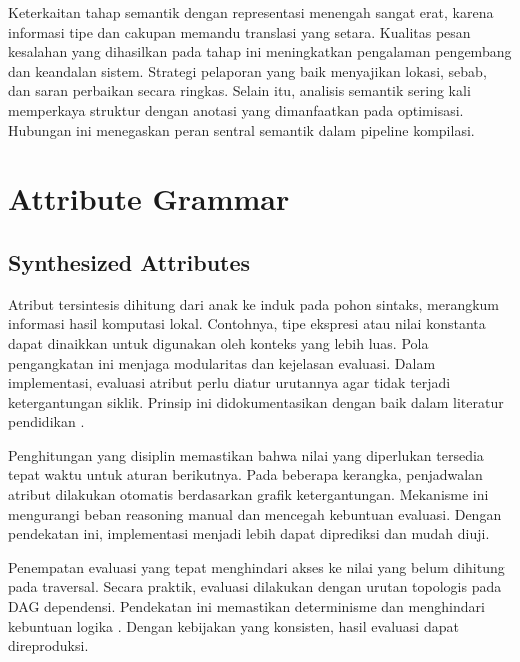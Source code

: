 \documentclass[../main.tex]{subfiles}
\begin{document}
Keterkaitan tahap semantik dengan representasi menengah sangat erat, karena informasi tipe dan cakupan memandu translasi yang setara. Kualitas pesan kesalahan yang dihasilkan pada tahap ini meningkatkan pengalaman pengembang dan keandalan sistem. Strategi pelaporan yang baik menyajikan lokasi, sebab, dan saran perbaikan secara ringkas. Selain itu, analisis semantik sering kali memperkaya struktur dengan anotasi yang dimanfaatkan pada optimisasi. Hubungan ini menegaskan peran sentral semantik dalam pipeline kompilasi.

\section{Attribute Grammar}
\subsection{Synthesized Attributes}
Atribut tersintesis dihitung dari anak ke induk pada pohon sintaks, merangkum informasi hasil komputasi lokal. Contohnya, tipe ekspresi atau nilai konstanta dapat dinaikkan untuk digunakan oleh konteks yang lebih luas. Pola pengangkatan ini menjaga modularitas dan kejelasan evaluasi. Dalam implementasi, evaluasi atribut perlu diatur urutannya agar tidak terjadi ketergantungan siklik. Prinsip ini didokumentasikan dengan baik dalam literatur pendidikan \citep{WikiAttributeGrammar}.

Penghitungan yang disiplin memastikan bahwa nilai yang diperlukan tersedia tepat waktu untuk aturan berikutnya. Pada beberapa kerangka, penjadwalan atribut dilakukan otomatis berdasarkan grafik ketergantungan. Mekanisme ini mengurangi beban reasoning manual dan mencegah kebuntuan evaluasi. Dengan pendekatan ini, implementasi menjadi lebih dapat diprediksi dan mudah diuji.

Penempatan evaluasi yang tepat menghindari akses ke nilai yang belum dihitung pada traversal. Secara praktik, evaluasi dilakukan dengan urutan topologis pada DAG dependensi. Pendekatan ini memastikan determinisme dan menghindari kebuntuan logika \citep{WikiAttributeGrammar}. Dengan kebijakan yang konsisten, hasil evaluasi dapat direproduksi.
\end{document}
